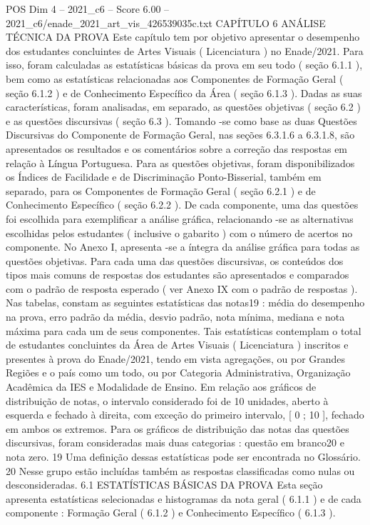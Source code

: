 \begin{textsample}{POS Dim 4 – 2021\_c6 – Score 6.00 – 2021\_c6/enade\_2021\_art\_vis\_426539035c.txt}  \label{ex:f4_pos_067}
CAPÍTULO 6 ANÁLISE TÉCNICA DA PROVA Este capítulo tem por objetivo apresentar o desempenho dos estudantes concluintes de Artes Visuais ( Licenciatura ) no Enade/2021.
Para isso, foram calculadas as estatísticas básicas da prova em seu todo ( seção 6.1.1 ), bem como as estatísticas relacionadas aos Componentes de Formação Geral ( seção 6.1.2 ) e de Conhecimento Específico da Área ( seção 6.1.3 ).
Dadas as suas características, foram analisadas, em separado, as questões objetivas ( seção 6.2 ) e as questões discursivas ( seção 6.3 ).
Tomando -se como base as duas Questões Discursivas do Componente de Formação Geral, nas seções 6.3.1.6 a 6.3.1.8, são apresentados os resultados e os comentários sobre a correção das respostas em relação à Língua Portuguesa.
Para as questões objetivas, foram disponibilizados os Índices de Facilidade e de Discriminação Ponto-Bisserial, também em separado, para os Componentes de Formação Geral ( seção 6.2.1 ) e de Conhecimento Específico ( seção 6.2.2 ).
De cada componente, uma das questões foi escolhida para exemplificar a análise gráfica, relacionando -se as alternativas escolhidas pelos estudantes ( inclusive o gabarito ) com o número de acertos no componente.
No Anexo I, apresenta -se a íntegra da análise gráfica para todas as questões objetivas.
Para cada uma das questões discursivas, os conteúdos dos tipos mais comuns de respostas dos estudantes são apresentados e comparados com o padrão de resposta esperado ( ver Anexo IX com o padrão de respostas ).
Nas tabelas, constam as seguintes estatísticas das notas19 : média do desempenho na prova, erro padrão da média, desvio padrão, nota mínima, mediana e nota máxima para cada um de seus componentes.
Tais estatísticas contemplam o total de estudantes concluintes da Área de Artes Visuais ( Licenciatura ) inscritos e presentes à prova do Enade/2021, tendo em vista agregações, ou por Grandes Regiões e o país como um todo, ou por Categoria Administrativa, Organização Acadêmica da IES e Modalidade de Ensino.
Em relação aos gráficos de distribuição de notas, o intervalo considerado foi de 10 unidades, aberto à esquerda e fechado à direita, com exceção do primeiro intervalo, [ 0 ; 10 ], fechado em ambos os extremos.
Para os gráficos de distribuição das notas das questões discursivas, foram consideradas mais duas categorias : questão em branco20 e nota zero. 19 Uma definição dessas estatísticas pode ser encontrada no Glossário. 20 Nesse grupo estão incluídas também as respostas classificadas como nulas ou desconsideradas. 6.1 ESTATÍSTICAS BÁSICAS DA PROVA Esta seção apresenta estatísticas selecionadas e histogramas da nota geral ( 6.1.1 ) e de cada componente : Formação Geral ( 6.1.2 ) e Conhecimento Específico ( 6.1.3 ).

\end{textsample}
